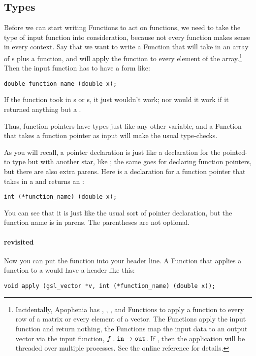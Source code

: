 \subsection{Types} Before we can start writing Functions to act on
functions, we need to take the type of input function into
consideration, because not every function makes sense in every context. Say
that we want to write a Function that will take in an array of
s plus a function, and will apply the function to every
element of the array.\footnote{Incidentally, Apophenia has 
, ,
, and  
Functions to apply a function to every row of
a matrix or every element of a vector. The  Functions 
apply the input function and return nothing, the 
Functions map the input data to an output vector via the input function,
$f: {\tt in}\rightarrow {\tt out}$.
If , then the
application will be threaded over multiple processes. See the online
reference for details.}
Then the input function has to have a form like:
\begin{lstlisting}
double function_name (double x);
\end{lstlisting}

If the function took in s or s, it just
wouldn't work; nor would it work if it returned anything but a
.

Thus, function pointers have types just like any other variable, and a
Function that takes a function pointer as input will make the usual
type-checks.

As you will recall, a pointer declaration is just like a declaration for the pointed-to type but with
another star, like ; the same goes for declaring function
pointers, but there are also extra parens. Here is a declaration for a
function pointer that takes in a  and returns an :
\begin{lstlisting}
int (*function_name) (double x);
\end{lstlisting}
You can see that it is just like the usual  sort of pointer
declaration, but the function name is in parens.  The parentheses are not
optional.

\paragraph{ revisited}
Now you can put the function into your header line. A Function that
applies a function to a  would have a header like
this:
\begin{lstlisting}
void apply (gsl_vector *v, int (*function_name) (double x));
\end{lstlisting}

